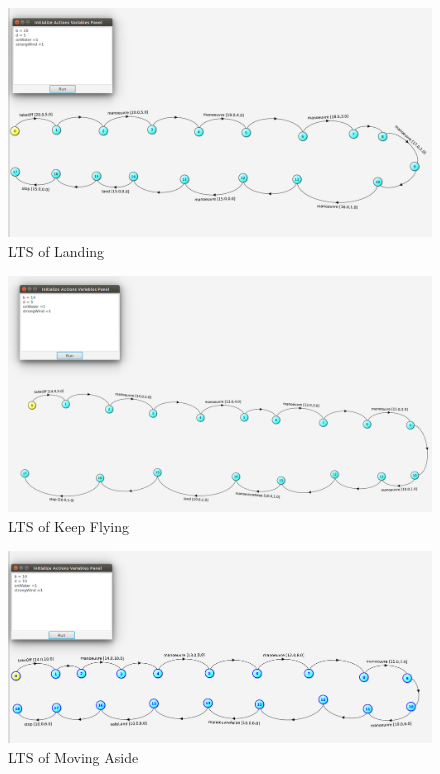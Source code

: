 \begin{figure}
 \includegraphics[width=\columnwidth]{figures/4-Land -final-LTS.png}
    \caption{LTS of Landing}
    \label{fig:landing}
    \vspace*{-0.25cm}
\end{figure}

\begin{figure}
 \includegraphics[width=\columnwidth]{figures/5-Keep Flying -final-LTS.png}
    \caption{LTS of Keep Flying}
    \label{fig:keepflying}
    \vspace*{-0.25cm}
\end{figure}

\begin{figure}
 \includegraphics[width=\columnwidth]{figures/6-Move Aside -final-LTS.png}
    \caption{LTS of Moving Aside}
    \label{fig:movingaside}
    \vspace*{-0.25cm}
\end{figure}

